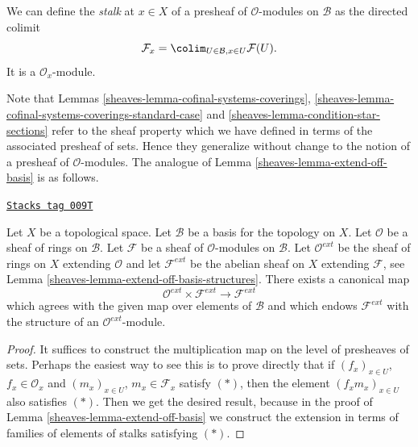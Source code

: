 We can define the {\it stalk} at $x \in X$
of a presheaf of $\mathcal{O}$-modules on $\mathcal{B}$
as the directed colimit
$$
\mathcal{F}_x = \colim_{U\in \mathcal{B}, x\in U} \mathcal{F}(U).
$$
It is a $\mathcal{O}_x$-module.

\medskip\noindent
Note that Lemmas \ref{sheaves-lemma-cofinal-systems-coverings},
\ref{sheaves-lemma-cofinal-systems-coverings-standard-case} and
\ref{sheaves-lemma-condition-star-sections} refer to the sheaf
property which we have defined in terms of the associated presheaf
of sets. Hence they generalize without change to the notion
of a presheaf of $\mathcal{O}$-modules. The analogue of
Lemma \ref{sheaves-lemma-extend-off-basis} is as follows.

\begin{lemma}
\label{sheaves-lemma-extend-off-basis-module}
\href{https://stacks.math.columbia.edu/tag/009T}{\texttt{Stacks tag 009T}}

Let $X$ be a topological space.
Let $\mathcal{B}$ be a basis for the topology on $X$.
Let $\mathcal{O}$ be a sheaf of rings on $\mathcal{B}$.
Let $\mathcal{F}$ be a sheaf of $\mathcal{O}$-modules
on $\mathcal{B}$. Let $\mathcal{O}^{ext}$ be the sheaf
of rings on $X$ extending $\mathcal{O}$ and let
$\mathcal{F}^{ext}$ be the abelian sheaf on $X$ extending
$\mathcal{F}$, see Lemma \ref{sheaves-lemma-extend-off-basis-structures}.
There exists a canonical map
$$
\mathcal{O}^{ext} \times \mathcal{F}^{ext}
\longrightarrow
\mathcal{F}^{ext}
$$
which agrees with the given map over elements of $\mathcal{B}$
and which endows $\mathcal{F}^{ext}$ with the structure
of an $\mathcal{O}^{ext}$-module.
\end{lemma}

\begin{proof}

It suffices to construct the multiplication map
on the level of presheaves of sets. Perhaps the easiest
way to see this is to prove directly that if
$(f_x)_{x \in U}$, $f_x \in \mathcal{O}_x$
and
$(m_x)_{x \in U}$, $m_x \in \mathcal{F}_x$
satisfy $(*)$, then the element
$(f_xm_x)_{x \in U}$ also satisfies $(*)$.
Then we get the desired result, because in the proof
of Lemma \ref{sheaves-lemma-extend-off-basis} we construct the extension
in terms of families of elements of stalks satisfying $(*)$.
\end{proof}

